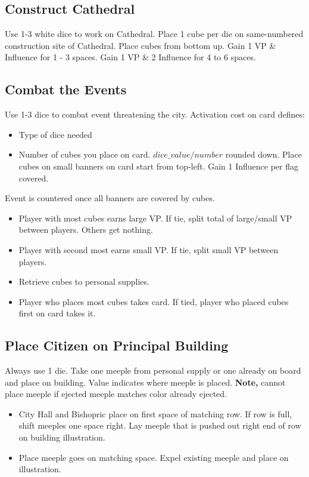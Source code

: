 \documentclass[10pt]{article}
\newenvironment{itemizeCustom}
{\begin{itemize}
  \setlength{\itemsep}{1pt}
  \setlength{\parskip}{0pt}
  \setlength{\parsep}{0pt}}
{\end{itemize}}
\begin{document}
\begin{multicols*}{2}
\subsection*{Construct Cathedral}
Use 1-3 white dice to work on Cathedral. Place 1 cube per die on same-numbered construction site of Cathedral. Place cubes from bottom up. Gain 1 VP \& Influence for 1 - 3 spaces. Gain 1 VP \& 2 Influence for 4 to 6 spaces.

\subsection*{Combat the Events}
Use 1-3 dice to combat event threatening the city. Activation cost on card defines:
\begin{itemizeCustom}
    \item Type of dice needed
    \item Number of cubes you place on card. \(dice\_value / number\) rounded down. Place cubes on small banners on card start from top-left. Gain 1 Influence per flag covered.
\end{itemizeCustom}

Event is countered once all banners are covered by cubes.
\begin{itemizeCustom}
    \item Player with most cubes earns large VP. If tie, split total of large/small VP between players. Others get nothing.
    \item Player with second most earns small VP. If tie, split small VP between players.
    \item Retrieve cubes to personal supplies.
    \item Player who places most cubes takes card. If tied, player who placed cubes first on card takes it.
\end{itemizeCustom}

\subsection*{Place Citizen on Principal Building}
Always use 1 die. Take one meeple from personal supply or one already on board and place on building. Value indicates where meeple is placed. \textbf{Note,} cannot place meeple if ejected meeple matches color already ejected.
\begin{itemizeCustom}
    \item City Hall and Bishopric place on first space of matching row. If row is full, shift meeples one space right. Lay meeple that is pushed out right end of row on building illustration.
    \item Place meeple goes on matching space. Expel existing meeple and place on illustration.
\end{itemizeCustom}


\end{multicols*}
\end{document}
